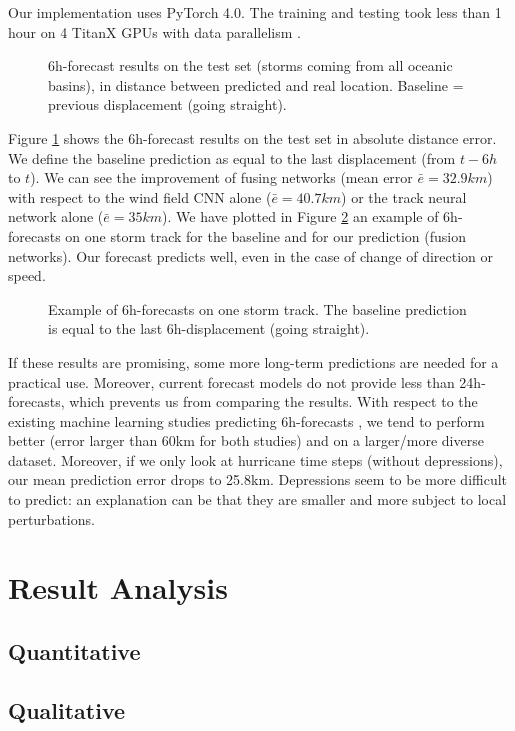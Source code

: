 Our implementation uses PyTorch 4.0.  The training and testing took less than 1 hour on 4 TitanX GPUs with data parallelism \cite{krizhevsky2014one}.




\begin{figure}
	\begin{center}
		\hsize {}
	\end{center}
	\caption{6h-forecast results on the test set (storms coming from all oceanic basins), in distance between predicted and real location. Baseline = previous displacement (going straight).}
	\label{fig:boxplots}
\end{figure}

Figure \ref{fig:boxplots} shows the 6h-forecast results on the test set in absolute distance error. We define the baseline prediction as equal to the last displacement (from $t-6h$ to $t$). We can see the improvement of fusing networks (mean error $\bar{e}=32.9km$) with respect to the wind field CNN alone ($\bar{e}=40.7km$) or the track neural network alone ($\bar{e}=35km$).
We have plotted in Figure \ref{fig:track} an example of 6h-forecasts on one storm track for the baseline and for our prediction (fusion networks). Our forecast predicts well, even in the case of change of direction or speed.


\begin{figure}
	\begin{center}
		\hsize {}
	\end{center}
	\caption{Example of 6h-forecasts on one storm track. The baseline prediction is equal to the last 6h-displacement (going straight).}
	\label{fig:track}
\end{figure}


If these results are promising, some more long-term predictions are needed for a practical use. Moreover, current forecast models do not provide less than 24h-forecasts, which prevents us from comparing the results. With respect to the existing machine learning studies predicting 6h-forecasts \cite{liberge2011prevision,moradi2016sparse}, we tend to perform better (error larger than 60km for both studies) and on a larger/more diverse dataset. Moreover, if we only look at hurricane time steps (without depressions), our mean prediction error drops to 25.8km. Depressions seem to be more difficult to predict: an explanation can be that they are smaller and more subject to local perturbations.

\section{Result Analysis}
\subsection{Quantitative}

\subsection{Qualitative}


